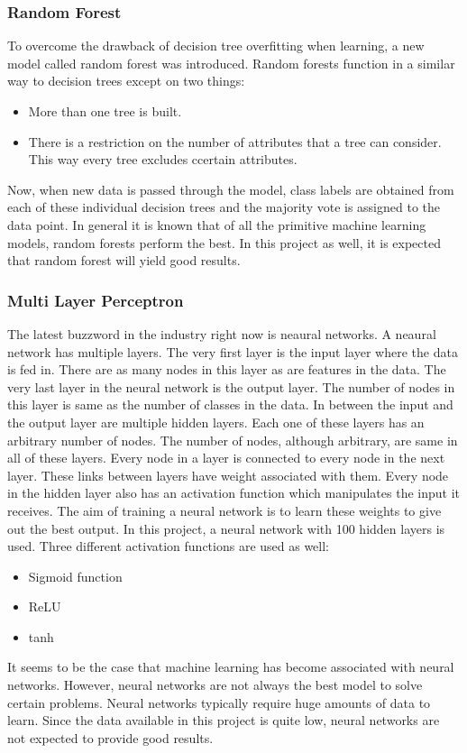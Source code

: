 \documentclass[11pt,a4paper]{article}
\begin{document}
\subsubsection{Random Forest}
\label{rf}
To overcome the drawback of decision tree overfitting when learning, a new model called random forest was introduced. Random forests function in a similar way to decision trees except on two things:
\begin{itemize}
  \item More than one tree is built.
  \item There is a restriction on the number of attributes that a tree can consider. This way every tree excludes ccertain attributes.
\end{itemize}
Now, when new data is passed through the model, class labels are obtained from each of these individual decision trees and the majority vote is assigned to the data point. In general it is known that of all the primitive machine learning models, random forests perform the best. In this project as well, it is expected that random forest will yield good results.

\subsubsection{Multi Layer Perceptron}
\label{mlp}
The latest buzzword in the industry right now is neaural networks. A neaural network has multiple layers. The very first layer is the input layer where the data is fed in. There are as many nodes in this layer as are features in the data. The very last layer in the neural network is the output layer. The number of nodes in this layer is same as the number of classes in the data. In between the input and the output layer are multiple hidden layers. Each one of these layers has an arbitrary number of nodes. The number of nodes, although arbitrary, are same in all of these layers. Every node in a layer is connected to every node in the next layer. These links between layers have weight associated with them. Every node in the hidden layer also has an activation function which manipulates the input it receives. The aim of training a neural network is to learn these weights to give out the best output. In this project, a neural network with 100 hidden layers is used. Three different activation functions are used as well:
\begin{itemize}
  \item Sigmoid function
  \item ReLU
  \item tanh
\end{itemize}
It seems to be the case that machine learning has become associated with neural networks. However, neural networks are not always the best model to solve certain problems. Neural networks typically require huge amounts of data to learn. Since the data available in this project is quite low, neural networks are not expected to provide good results.
\end{document}

